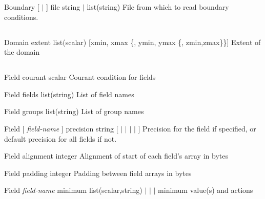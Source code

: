 \documentclass{article}
\begin{document}
\Parameter
{Boundary} 
{[  $|$  ]} 
{file} 
{string $|$ list(string)} 
{} 
{File from which to read boundary conditions.  } 
{} 
{}

\subsection{}

\Parameter
{Domain} 
{} 
{extent} 
{list(scalar)} 
{[xmin, xmax \{, ymin, ymax \{, zmin,zmax\}\}]}
{Extent of the domain} 
{} 
{}

\subsection{}

\Parameter
{Field} 
{} 
{courant} 
{scalar} 
{} 
{Courant condition for fields} 
{} 
{}

\Parameter
{Field} 
{} 
{fields} 
{list(string)} 
{} 
{List of field names} 
{} 
{}

\Parameter
{Field} 
{} 
{groups} 
{list(string)} 
{} 
{List of group names} 
{} 
{}

\Parameter
{Field} 
{[ \textit{field-name} ]} 
{precision} 
{string} 
{[   
$|$  
$|$ 
$|$ 
$|$  ] } 
{Precision for the field if specified, or default precision for all fields if not.} 
{} 
{}

\Parameter
{Field}
{}
{alignment}
{integer}
{}
{Alignment of start of each field's array in bytes}
{}
{}

\Parameter
{Field}
{}
{padding}
{integer}
{}
{Padding between field arrays in bytes}
{}
{}

\Parameter
{Field}
{\textit{field-name}}
{minimum}
{list(scalar,string)}
{ $|$  $|$  $|$ }
{minimum value(s) and actions }
{}
{}
\end{document}

